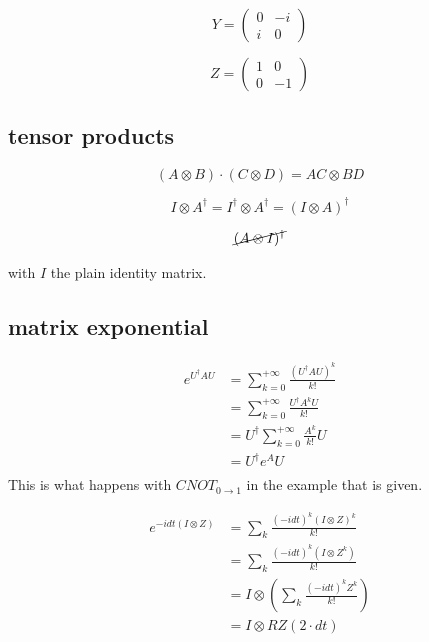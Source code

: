\documentclass{article}
\begin{document}
$$ Y = \begin{pmatrix} 0 & -i \\ i & 0 \end{pmatrix} $$

$$ Z = \begin{pmatrix} 1 & 0 \\ 0 & -1 \end{pmatrix} $$

\subsection{tensor products}

$$ (A\otimes B)\cdot (C\otimes D) = AC\otimes BD $$

$$ I\otimes A^{\dagger} = I^{\dagger}\otimes A^{\dagger} = 
(I\otimes A)^{\dagger}   $$

$$\cancel{(A\otimes I)^{\dagger}}  $$

with $I$ the plain identity matrix.
\subsection{matrix exponential}

\begin{align*}
e^{U^{\dagger}AU} &= \sum_{k=0}^{+\infty} \frac{(U^{\dagger}AU)^{k}}{k!} \\ 
&= \sum_{k=0}^{+\infty} \frac{U^{\dagger}A^{k}U}{k!} \\ 
&= U^{\dagger}\sum_{k=0}^{+\infty} \frac{A^{k}}{k!}U \\ 
&= U^{\dagger}e^{A}U \\ 
\end{align*}
This is what happens with $CNOT_{0\rightarrow 1}$
in the example that is given.

\begin{align*}
    e^{-idt(I\otimes Z)} &= \sum_{k} \frac{(-idt)^k (I\otimes Z)^k }{k!} \\
    &= \sum_{k} \frac{(-idt)^k (I\otimes Z^k) }{k!} \\
    &= I \otimes \left(\sum_{k} \frac{(-idt)^k  Z^k }{k!} \right) \\
    &= I \otimes RZ(2\cdot dt)
\end{align*}




\end{document}
